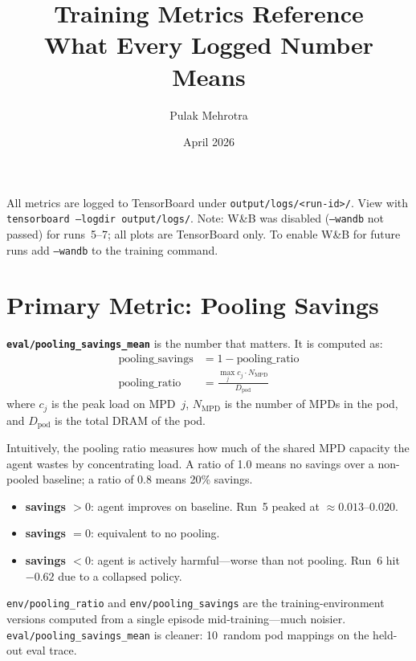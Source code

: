 \documentclass[11pt]{article}
\title{Training Metrics Reference\\
\large What Every Logged Number Means}
\author{Pulak Mehrotra}
\date{April 2026}
\begin{document}
\maketitle
\tableofcontents

All metrics are logged to TensorBoard under \texttt{output/logs/<run-id>/}.
View with \texttt{tensorboard --logdir output/logs/}.
Note: W\&B was disabled (\texttt{--wandb} not passed) for runs~5--7; all plots
are TensorBoard only. To enable W\&B for future runs add \texttt{--wandb} to
the training command.

\section{Primary Metric: Pooling Savings}

\textbf{\texttt{eval/pooling\_savings\_mean}} is the number that matters.
It is computed as:
\begin{align}
  \text{pooling\_savings} &= 1 - \text{pooling\_ratio} \\
  \text{pooling\_ratio}   &= \frac{\max_j c_j \cdot N_{\text{MPD}}}{D_{\text{pod}}}
\end{align}
where $c_j$ is the peak load on MPD~$j$, $N_{\text{MPD}}$ is the number of MPDs
in the pod, and $D_{\text{pod}}$ is the total DRAM of the pod.

Intuitively, the pooling ratio measures how much of the shared MPD capacity the
agent wastes by concentrating load.  A ratio of 1.0 means no savings over a
non-pooled baseline; a ratio of 0.8 means 20\% savings.

\begin{itemize}
  \item \textbf{savings $> 0$}: agent improves on baseline.
        Run~5 peaked at $\approx 0.013$--$0.020$.
  \item \textbf{savings $= 0$}: equivalent to no pooling.
  \item \textbf{savings $< 0$}: agent is actively harmful---worse than not pooling.
        Run~6 hit $-0.62$ due to a collapsed policy.
\end{itemize}

\texttt{env/pooling\_ratio} and \texttt{env/pooling\_savings} are the
training-environment versions computed from a single episode mid-training---much
noisier.  \texttt{eval/pooling\_savings\_mean} is cleaner: 10~random pod
mappings on the held-out eval trace.

\end{document}
